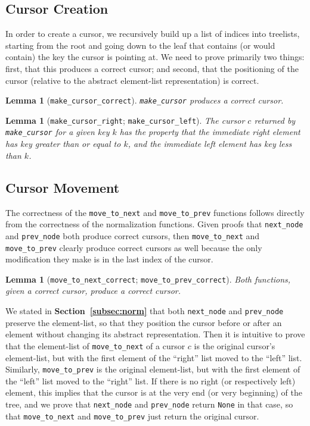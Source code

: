 \documentclass[12pt]{article}
\newtheorem{lemma}[theorem]{Lemma}
\begin{document}
\subsection{Cursor Creation}

In order to create a cursor, we recursively build up a list of indices into treelists, starting from the root and going down to the leaf that contains (or would contain) the key the cursor is pointing at. We need to prove primarily two things: first, that this produces a correct cursor; and second, that the positioning of the cursor (relative to the abstract element-list representation) is correct.

\begin{lemma}[\texttt{make\_cursor\_correct}]
\texttt{make\_cursor} produces a correct cursor.
\end{lemma}

\begin{lemma}[\texttt{make\_cursor\_right}; \texttt{make\_cursor\_left}]
The cursor $c$ returned by \texttt{make\_cursor} for a given key $k$ has the property that the immediate right element has key greater than or equal to $k$, and the immediate left element has key less than $k$.
\end{lemma}

\subsection{Cursor Movement}

The correctness of the \texttt{move\_to\_next} and \texttt{move\_to\_prev} functions follows directly from the correctness of the normalization functions. Given proofs that \texttt{next\_node} and \texttt{prev\_node} both produce correct cursors, then \texttt{move\_to\_next} and \texttt{move\_to\_prev} clearly produce correct cursors as well because the only modification they make is in the last index of the cursor.

\begin{lemma}[\texttt{move\_to\_next\_correct}; \texttt{move\_to\_prev\_correct}]
Both functions, given a correct cursor, produce a correct cursor.
\end{lemma}

We stated in \textbf{Section~\ref{subsec:norm}} that both \texttt{next\_node} and \texttt{prev\_node} preserve the element-list, so that they position the cursor before or after an element without changing its abstract representation. Then it is intuitive to prove that the element-list of \texttt{move\_to\_next} of a cursor $c$ is the original cursor’s element-list, but with the first element of the “right” list moved to the “left” list. Similarly, \texttt{move\_to\_prev} is the original element-list, but with the first element of the “left” list moved to the “right” list. If there is no right (or respectively left) element, this implies that the cursor is at the very end (or very beginning) of the tree, and we prove that \texttt{next\_node} and \texttt{prev\_node} return \texttt{None} in that case, so that \texttt{move\_to\_next} and \texttt{move\_to\_prev} just return the original cursor.
\end{document}
